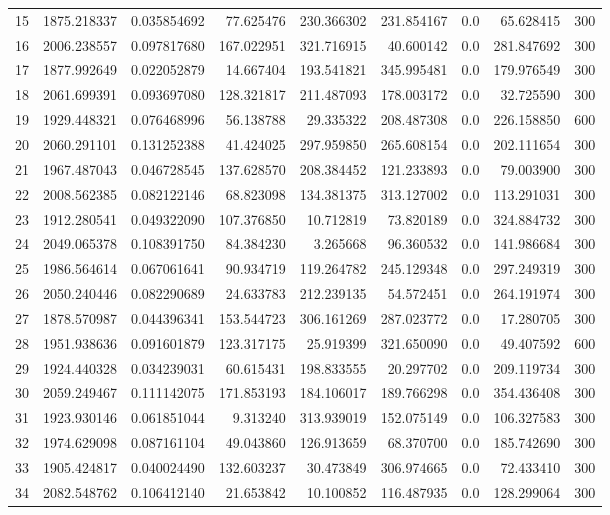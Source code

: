 \begin{longtable}{rrrrrrrrr}
15 & 1875.218337 & 0.035854692 & 77.625476 & 230.366302 & 231.854167 & 0.0 & 65.628415 & 300 \\
16 & 2006.238557 & 0.097817680 & 167.022951 & 321.716915 & 40.600142 & 0.0 & 281.847692 & 300 \\
17 & 1877.992649 & 0.022052879 & 14.667404 & 193.541821 & 345.995481 & 0.0 & 179.976549 & 300 \\
18 & 2061.699391 & 0.093697080 & 128.321817 & 211.487093 & 178.003172 & 0.0 & 32.725590 & 300 \\
19 & 1929.448321 & 0.076468996 & 56.138788 & 29.335322 & 208.487308 & 0.0 & 226.158850 & 600 \\
20 & 2060.291101 & 0.131252388 & 41.424025 & 297.959850 & 265.608154 & 0.0 & 202.111654 & 300 \\
21 & 1967.487043 & 0.046728545 & 137.628570 & 208.384452 & 121.233893 & 0.0 & 79.003900 & 300 \\
22 & 2008.562385 & 0.082122146 & 68.823098 & 134.381375 & 313.127002 & 0.0 & 113.291031 & 300 \\
23 & 1912.280541 & 0.049322090 & 107.376850 & 10.712819 & 73.820189 & 0.0 & 324.884732 & 300 \\
24 & 2049.065378 & 0.108391750 & 84.384230 & 3.265668 & 96.360532 & 0.0 & 141.986684 & 300 \\
25 & 1986.564614 & 0.067061641 & 90.934719 & 119.264782 & 245.129348 & 0.0 & 297.249319 & 300 \\
26 & 2050.240446 & 0.082290689 & 24.633783 & 212.239135 & 54.572451 & 0.0 & 264.191974 & 300 \\
27 & 1878.570987 & 0.044396341 & 153.544723 & 306.161269 & 287.023772 & 0.0 & 17.280705 & 300 \\
28 & 1951.938636 & 0.091601879 & 123.317175 & 25.919399 & 321.650090 & 0.0 & 49.407592 & 600 \\
29 & 1924.440328 & 0.034239031 & 60.615431 & 198.833555 & 20.297702 & 0.0 & 209.119734 & 300 \\
30 & 2059.249467 & 0.111142075 & 171.853193 & 184.106017 & 189.766298 & 0.0 & 354.436408 & 300 \\
31 & 1923.930146 & 0.061851044 & 9.313240 & 313.939019 & 152.075149 & 0.0 & 106.327583 & 300 \\
32 & 1974.629098 & 0.087161104 & 49.043860 & 126.913659 & 68.370700 & 0.0 & 185.742690 & 300 \\
33 & 1905.424817 & 0.040024490 & 132.603237 & 30.473849 & 306.974665 & 0.0 & 72.433410 & 300 \\
34 & 2082.548762 & 0.106412140 & 21.653842 & 10.100852 & 116.487935 & 0.0 & 128.299064 & 300 \\

\end{longtable}

